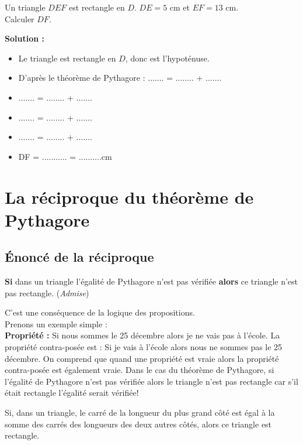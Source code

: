 \begin{examplebox}
Un triangle $DEF$ est rectangle en $D$. $DE = 5$ cm et $EF = 13$ cm.\\
Calculer $DF$.

\textbf{Solution :}
\begin{itemize}
    \item Le triangle est rectangle en $D$, donc \trous{1.5cm} est l'hypoténuse.
    \item D'après le théorème de Pythagore : ....... = ........ + .......
    \item ....... = ........ + .......
    \item ....... = ........ + .......
    \item ....... = ........ + .......
    \item DF = ........... = ..........cm
\end{itemize}
\end{examplebox}

\section{La réciproque du théorème de Pythagore}

\subsection{Énoncé de la réciproque}
\begin{theoremebox}
	\textbf{Si} dans un triangle l’égalité de Pythagore n’est pas vérifiée \textbf{alors} ce triangle n’est pas rectangle. \qquad (\textit{Admise})
\end{theoremebox}
\begin{demobox}
C’est une conséquence de la logique des propositions.\\
Prenons un exemple simple :\\

\textbf{Propriété :} Si nous sommes le 25 décembre alors je ne vais pas à l’école. La propriété contra-posée est : Si je vais à l'école alors nous ne sommes pas le 25 décembre. On comprend que quand une propriété est vraie alors la propriété contra-posée est également vraie. Dans le cas du théorème de Pythagore, si l’égalité de Pythagore n’est pas vérifiée alors le triangle n’est pas rectangle car s’il était rectangle l’égalité serait vérifiée!
\end{demobox}
\begin{theoremebox}
Si, dans un triangle, le carré de la longueur du plus grand côté est égal à la somme des carrés des longueurs des deux autres côtés, alors ce triangle est rectangle.
\end{theoremebox}


